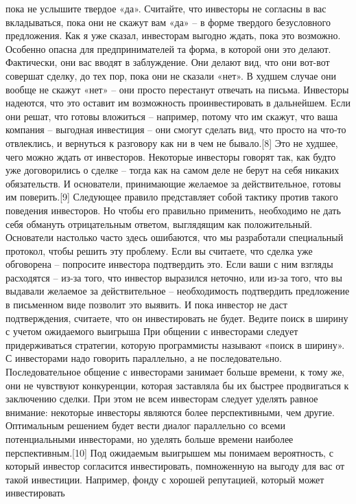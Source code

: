 \documentclass[ebook,12pt,oneside,openany]{memoir}
\begin{document}
пока не услышите твердое «да». Считайте, что инвесторы не согласны в
вас вкладываться, пока они не скажут вам «да» – в форме твердого
безусловного предложения. Как я уже сказал, инвесторам выгодно ждать,
пока это возможно. Особенно опасна для предпринимателей та форма, в
которой они это делают. Фактически, они вас вводят в заблуждение. Они
делают вид, что они вот-вот совершат сделку, до тех пор, пока они не
сказали «нет». В худшем случае они вообще не скажут «нет» – они просто
перестанут отвечать на письма. Инвесторы надеются, что это оставит им
возможность проинвестировать в дальнейшем. Если они решат, что готовы
вложиться – например, потому что им скажут, что ваша компания –
выгодная инвестиция – они смогут сделать вид, что просто на что-то
отвлеклись, и вернуться к разговору как ни в чем не бывало.[8] Это не
худшее, чего можно ждать от инвесторов. Некоторые инвесторы говорят
так, как будто уже договорились о сделке – тогда как на самом деле не
берут на себя никаких обязательств. И основатели, принимающие желаемое
за действительное, готовы им поверить.[9] Следующее правило
представляет собой тактику против такого поведения инвесторов. Но
чтобы его правильно применить, необходимо не дать себя обмануть
отрицательным ответом, выглядящим как положительный. Основатели
настолько часто здесь ошибаются, что мы разработали специальный
протокол, чтобы решить эту проблему. Если вы считаете, что сделка уже
обговорена – попросите инвестора подтвердить это. Если ваши с ним
взгляды расходятся – из-за того, что инвестор выразился неточно, или
из-за того, что вы выдавали желаемое за действительное – необходимость
подтвердить предложение в письменном виде позволит это выявить. И пока
инвестор не даст подтверждения, считаете, что он инвестировать не
будет. Ведите поиск в ширину с учетом ожидаемого выигрыша При общении
с инвесторами следует придерживаться стратегии, которую программисты
называют «поиск в ширину». С инвесторами надо говорить параллельно, а
не последовательно. Последовательное общение с инвесторами занимает
больше времени, к тому же, они не чувствуют конкуренции, которая
заставляла бы их быстрее продвигаться к заключению сделки. При этом не
всем инвесторам следует уделять равное внимание: некоторые инвесторы
являются более перспективными, чем другие. Оптимальным решением будет
вести диалог параллельно со всеми потенциальными инвесторами, но
уделять больше времени наиболее перспективным.[10] Под ожидаемым
выигрышем мы понимаем вероятность, с который инвестор согласится
инвестировать, помноженную на выгоду для вас от такой инвестиции.
Например, фонду с хорошей репутацией, который может инвестировать
\end{document}
